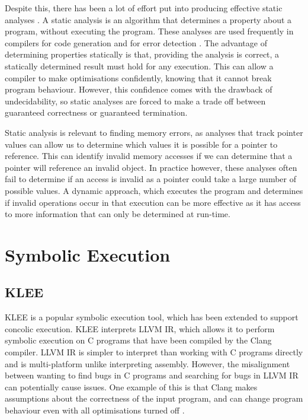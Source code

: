 \documentclass[12pt,twoside]{report}
\begin{document}
Despite this, there has been a lot of effort put into producing effective static analyses \cite{johnson1977lint,bushstaticanalysis,wilson1995efficient}. A static analysis is an algorithm that determines a property about a program, without executing the program. These analyses are used frequently in compilers for code generation \cite{wilson1995efficient} and for error detection \cite{bushstaticanalysis}. The advantage of determining properties statically is that, providing the analysis is correct, a statically determined result must hold for any execution. This can allow a compiler to make optimisations confidently, knowing that it cannot break program behaviour. However, this confidence comes with the drawback of undecidability, so static analyses are forced to make a trade off between guaranteed correctness or guaranteed termination.

Static analysis is relevant to finding memory errors, as analyses that track pointer values\cite{wilson1995efficient} can allow us to determine which values it is possible for a pointer to reference. This can identify invalid memory accesses if we can determine that a pointer will reference an invalid object. In practice however, these analyses often fail to determine if an access is invalid as a pointer could take a large number of possible values. A dynamic approach, which executes the program and determines if invalid operations occur in that execution can be more effective as it has access to more information that can only be determined at run-time.

\section{Symbolic Execution}
\subsection{KLEE}
KLEE \cite{cadar2008klee} is a popular symbolic execution tool, which has been extended to support concolic execution. KLEE interprets LLVM IR, which allows it to perform symbolic execution on C programs that have been compiled by the Clang compiler. LLVM IR is simpler to interpret than working with C programs directly and is multi-platform unlike interpreting assembly. However, the misalignment between wanting to find bugs in C programs and searching for bugs in LLVM IR can potentially cause issues. One example of this is that Clang makes assumptions about the correctness of the input program, and can change program behaviour even with all optimisations turned off \cite{unstable code paper}.
\end{document}
